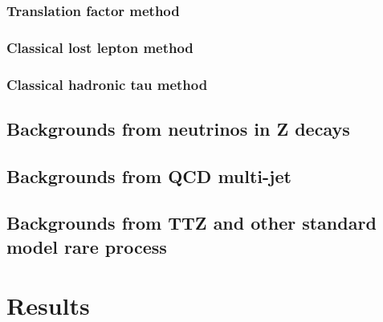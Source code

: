 \clearpage
\subsubsection{Translation factor method}
\label{sec:c4bgtf}


\clearpage
\subsubsection{Classical lost lepton method}
\label{sec:c4bgll}


\clearpage
\subsubsection{Classical hadronic tau method}
\label{sec:c4bghadtau}


\clearpage
\subsection{Backgrounds from neutrinos in Z decays}
\label{sec:c4bgzinv}


\clearpage
\subsection{Backgrounds from QCD multi-jet}
\label{sec:c4bgqcd}


\clearpage
\subsection{Backgrounds from TTZ and other standard model rare process}
\label{sec:c4bgttzrare}


\clearpage
\section{Results}
\label{sec:c4results}

